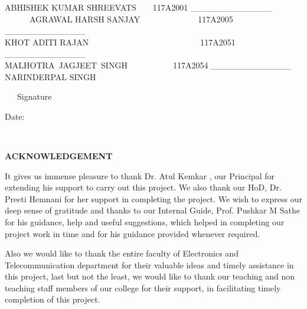 \documentclass[12pt]{article}
\begin{document}
\vspace{\baselineskip}

\vspace{\baselineskip}
ABHISHEK KUMAR SHREEVATS\ \ \ \  117A2001 \_\_\_\_\_\_\_\_\_\_\_\_\_\ \\ \ \ \ \ \ \  
AGRAWAL HARSH SANJAY\ \ \ \ \ \ \ \ \ \ \ \ \ \  117A2005 \_\_\_\_\_\_\_\_\_\_\_\_\_\\
KHOT ADITI RAJAN\ \ \ \ \ \ \ \ \ \ \ \ \ \ \ \ \ \ \ \ \ \ \ \ \ \ \  117A2051 \_\_\_\_\_\_\_\_\_\_\_\_\_ \\
MALHOTRA\ JAGJEET\ SINGH\ \ \ \ \ \ \ \ \ \ \    117A2054 \_\_\_\_\_\_\_\_\_\_\_\_\_\\
 NARINDERPAL SINGH\ \ \ \ \  
\begin{adjustwidth}{2.0in}{0.0in}
\begin{Center}
\ \ \ Signature
\end{Center}
\end{adjustwidth}


\vspace{\baselineskip}

\vspace{\baselineskip}
Date:

\vspace{\baselineskip}
\ \ \ \ \ \ \ \ \ \ \ \ \ \ \ \ \ \ \ \ \ \ \ \ \ \ \ \ \ \ \ \ \ \ \ \ \ \ \ \ \ \ \ \ \ \ \ \ \ \ \ \ \ \ \ \ \ \  

\vspace{\baselineskip}
\vspace{\baselineskip}
\vspace{\baselineskip}
\vspace{\baselineskip}
\vspace{\baselineskip}
\vspace{\baselineskip}
\vspace{\baselineskip}


\begin{Center}
\textbf{ACKNOWLEDGEMENT}
\end{Center}
\begin{justify}
It gives us immense pleasure to thank Dr. Atul Kemkar , our Principal for extending his support to carry out this project. We also thank our HoD, Dr. Preeti Hemnani for her support in completing the project. We wish to express our deep sense of gratitude and thanks to our Internal Guide, Prof. Pushkar M Sathe for his guidance, help and useful suggestions, which helped in completing our project work in time and for his guidance provided whenever required.
\end{justify}
\begin{justify}
Also we would like to thank the entire faculty of Electronics and Telecommunication department for their valuable ideas and timely assistance in this project, last but not the least, we would like to thank our teaching and non teaching staff members of our college for their support, in facilitating timely completion of this project.
\end{justify}
\end{document}

